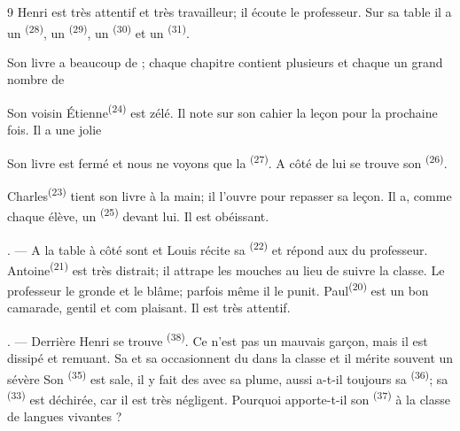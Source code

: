 \begin{VUpage}[11]{9}
\VUblancAlinea
Henri est très attentif et très travailleur; il écoute\nl
le professeur. Sur sa table il a un  \textsuperscript{(28)}, un\nl
{}\textsuperscript{(29)}, un \textsuperscript{(30)} et un \textsuperscript{(31)}.

Son livre a beaucoup de ; chaque chapitre\nl
contient plusieurs  et chaque  un\nl
grand nombre de 

\VUblancAlinea
Son voisin Étienne\textsuperscript{(24)} est zélé. Il note sur son\nl
cahier la leçon pour la prochaine fois. Il a une jolie\nl
{}

\VUblancAlinea
Son livre est fermé et nous ne voyons que la \cc
{} \textsuperscript{(27)}. A côté de lui se trouve son \textsuperscript{(26)}.

\VUblancAlinea
Charles\textsuperscript{(23)} tient son livre à la main; il l'ouvre pour\nl
repasser sa leçon. Il a, comme chaque élève, un\nl
{}\textsuperscript{(25)} devant lui. Il est obéissant.

. --- A la table à côté sont  et\nl
{} Louis récite sa  \textsuperscript{(22)} et répond aux \cc
{} du professeur. Antoine\textsuperscript{(21)} est très distrait; il\nl
attrape les mouches au lieu de suivre la classe. Le\nl
professeur le gronde et le blâme; parfois même il le\nl
punit. Paul\textsuperscript{(20)} est un bon camarade, gentil et com\cc
plaisant. Il est très attentif.

. --- Derrière Henri se trouve  \textsuperscript{(38)}. Ce\nl
n'est pas un mauvais garçon, mais il est \nl
dissipé et remuant. Sa  et sa \cc
{} occasionnent du  dans la classe et\nl
il mérite souvent un sévère  Son\nl
{} \textsuperscript{(35)} est sale, il y fait des \nl
{} avec sa plume, aussi a-t-il toujours sa \nl
{} \textsuperscript{(36)}; sa  \textsuperscript{(33)} est déchirée, car il\nl
est très négligent. Pourquoi apporte-t-il son \cc
{}\textsuperscript{(37)} à la classe de langues vivantes ?


\end{VUpage}

